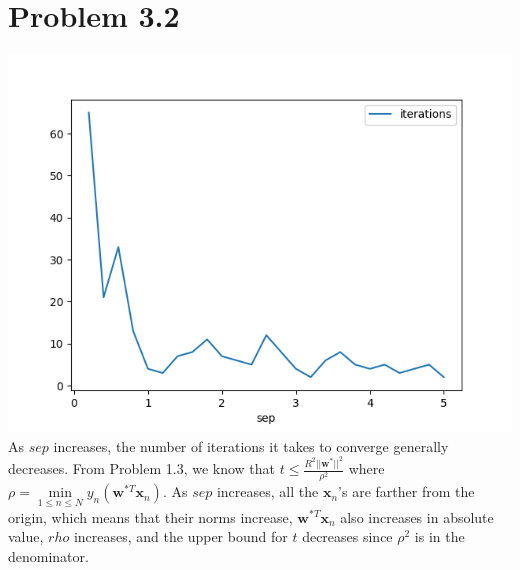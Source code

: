 \documentclass{article}
\begin{document}
	\section*{Problem 3.2}
		\includegraphics[scale=0.7]{p3.2.png}\\
		As $sep$ increases, the number of iterations it takes to converge generally decreases. From Problem 1.3, we know that $t \leq \frac{R^2||\mathbf w^*||^2}{\rho^2}$ where $\rho = \min\limits_{1 \leq n \leq N}y_n(\mathbf w^{*T} \mathbf x_n)$. As $sep$ increases, all the $\mathbf x_n$'s are farther from the origin, which means that their norms increase, $\mathbf w^{*T} \mathbf x_n$ also increases in absolute value, $rho$ increases, and the upper bound for $t$ decreases since $\rho^2$ is in the denominator.
		
\end{document}
